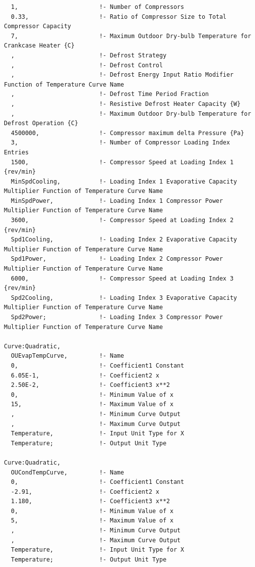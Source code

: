 \begin{lstlisting}
  1,                       !- Number of Compressors
  0.33,                    !- Ratio of Compressor Size to Total Compressor Capacity
  7,                       !- Maximum Outdoor Dry-bulb Temperature for Crankcase Heater {C}
  ,                        !- Defrost Strategy
  ,                        !- Defrost Control
  ,                        !- Defrost Energy Input Ratio Modifier Function of Temperature Curve Name
  ,                        !- Defrost Time Period Fraction
  ,                        !- Resistive Defrost Heater Capacity {W}
  ,                        !- Maximum Outdoor Dry-bulb Temperature for Defrost Operation {C}
  4500000,                 !- Compressor maximum delta Pressure {Pa}
  3,                       !- Number of Compressor Loading Index Entries
  1500,                    !- Compressor Speed at Loading Index 1 {rev/min}
  MinSpdCooling,           !- Loading Index 1 Evaporative Capacity Multiplier Function of Temperature Curve Name
  MinSpdPower,             !- Loading Index 1 Compressor Power Multiplier Function of Temperature Curve Name
  3600,                    !- Compressor Speed at Loading Index 2 {rev/min}
  Spd1Cooling,             !- Loading Index 2 Evaporative Capacity Multiplier Function of Temperature Curve Name
  Spd1Power,               !- Loading Index 2 Compressor Power Multiplier Function of Temperature Curve Name
  6000,                    !- Compressor Speed at Loading Index 3 {rev/min}
  Spd2Cooling,             !- Loading Index 3 Evaporative Capacity Multiplier Function of Temperature Curve Name
  Spd2Power;               !- Loading Index 3 Compressor Power Multiplier Function of Temperature Curve Name

Curve:Quadratic,
  OUEvapTempCurve,         !- Name
  0,                       !- Coefficient1 Constant
  6.05E-1,                 !- Coefficient2 x
  2.50E-2,                 !- Coefficient3 x**2
  0,                       !- Minimum Value of x
  15,                      !- Maximum Value of x
  ,                        !- Minimum Curve Output
  ,                        !- Maximum Curve Output
  Temperature,             !- Input Unit Type for X
  Temperature;             !- Output Unit Type

Curve:Quadratic,
  OUCondTempCurve,         !- Name
  0,                       !- Coefficient1 Constant
  -2.91,                   !- Coefficient2 x
  1.180,                   !- Coefficient3 x**2
  0,                       !- Minimum Value of x
  5,                       !- Maximum Value of x
  ,                        !- Minimum Curve Output
  ,                        !- Maximum Curve Output
  Temperature,             !- Input Unit Type for X
  Temperature;             !- Output Unit Type


\end{lstlisting}
